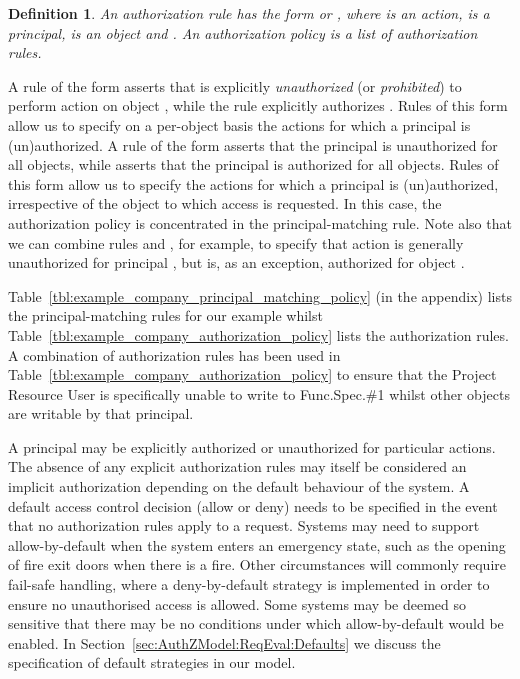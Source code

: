 \documentclass{article}
\newtheorem{definition}{Definition}
\begin{document}
\begin{definition}
    An \emph{authorization rule} has the form  or , where  is an action,  is a principal,  is an object and .
An \emph{authorization policy} is a list of authorization rules.
\end{definition}

A rule of the form  asserts that  is explicitly \emph{unauthorized} (or \emph{prohibited}) to perform action  on object , while the rule  explicitly authorizes .
Rules of this form allow us to specify on a per-object basis the actions for which a principal  is (un)authorized.
A rule of the form  asserts that the principal is unauthorized for all objects, while  asserts that the principal is authorized for all objects.
Rules of this form allow us to specify the actions for which a principal is (un)authorized, irrespective of the object to which access is requested.
In this case, the authorization policy is concentrated in the principal-matching rule.
Note also that we can combine rules  and , for example, to specify that action  is generally unauthorized for principal , but is, as an exception, authorized for object .

Table~\ref{tbl:example_company_principal_matching_policy} (in the appendix) lists the principal-matching rules for our example whilst Table~\ref{tbl:example_company_authorization_policy} lists the authorization rules. A combination of authorization rules has been used in Table~\ref{tbl:example_company_authorization_policy} to ensure that the \textsf{Project Resource User} is specifically unable to write to \textsf{Func.Spec.\#1} whilst other objects are writable by that principal.

A principal may be explicitly authorized or unauthorized for particular actions.
The absence of any explicit authorization rules may itself be considered an implicit authorization depending on the default behaviour of the system.
A default access control decision (allow or deny) needs to be specified in the event that no authorization rules apply to a request.
Systems may need to support \textsf{allow-by-default} when the system enters an emergency state, such as the opening of fire exit doors when there is a fire.
Other circumstances will commonly require fail-safe handling, where a \textsf{deny-by-default} strategy is implemented in order to ensure no unauthorised access is allowed. Some systems may be deemed so sensitive that there may be no conditions under which \textsf{allow-by-default} would be enabled.
In Section~\ref{sec:AuthZModel:ReqEval:Defaults} we discuss the specification of default strategies in our model.
\end{document}
